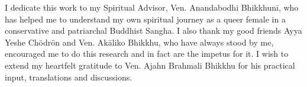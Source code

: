 \vspace{\fill}
\clearpage
\bigskip

\small I dedicate this work to my Spiritual Advisor, Ven. Anandabodhi Bhikkhunī, who has helped me to understand my own spiritual journey as a queer female in a conservative and patriarchal Buddhist Sangha. I also thank my good friends Ayya Yeshe Chödrön and Ven. Akāliko Bhikkhu, who have always stood by me, encouraged me to do this research and in fact are the impetus for it. I wish to extend my heartfelt gratitude to Ven. Ajahn Brahmali Bhikkhu for his practical input, translations and discussions.

